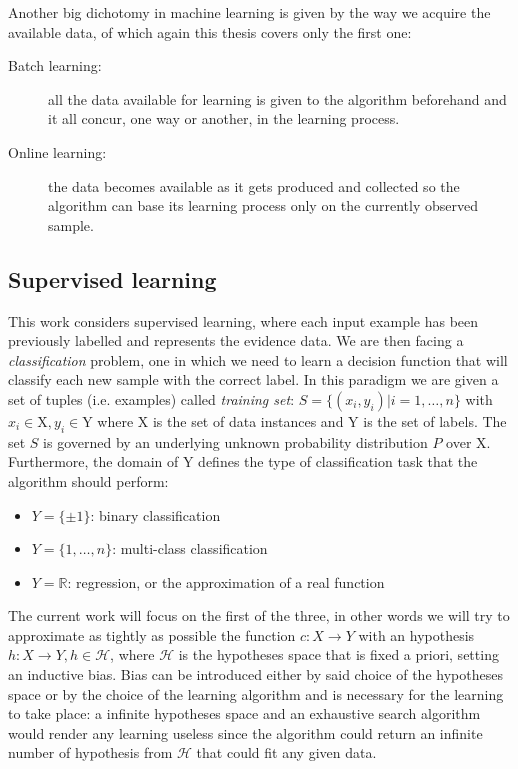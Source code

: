 Another big dichotomy in machine learning is given by the way we acquire the
available data, of which again this thesis covers only the first one:

\begin{description}
    \item [Batch learning:] all the data available for learning is given to the
        algorithm beforehand and it all concur, one way or another, in the
        learning process.
    \item [Online learning:] the data becomes available as it gets produced
        and collected so the algorithm can base its learning process only
        on the currently observed sample.
\end{description}

\subsection{Supervised learning}
\label{subsec:sup}

This work considers supervised learning, where each input example has been
previously labelled and represents the evidence data.
We are then facing a \emph{classification} problem, one in which we need to learn
a decision function that will classify each new sample with the correct label.
In this paradigm we are given a set of tuples (i.e. examples) called \emph{training set}:
$S = \{(x_i, y_i)| i=1,\dots,n\}$ with $x_i \in \mathrm{X}, y_i \in \mathrm{Y}$
where $\mathrm{X}$ is the set of data instances and $\mathrm{Y}$ is the set of
labels.
The set $S$ is governed by an underlying unknown probability distribution $P$ over
$\mathrm{X}$.
Furthermore, the domain of $\mathrm{Y}$ defines the type of classification task
that the algorithm should perform:
\begin{itemize}
    \item $Y = \{\pm{1}\}$: binary classification
    \item $Y = \{1,\dots,n\}$: multi-class classification
    \item $Y = \mathbb{R}$: regression, or the approximation of a real function
\end{itemize}

The current work will focus on the first of the three, in other words we will
try to approximate as tightly as possible the function $c:X\to Y$ with an
hypothesis $h:X\to Y, h\in \mathcal{H}$, where $\mathcal{H}$ is the hypotheses
space that is fixed a priori, setting an inductive bias.
Bias can be introduced either by said choice of the hypotheses space or by the
choice of the learning algorithm and is necessary for the learning to take place:
a infinite hypotheses space and an exhaustive search algorithm would render
any learning useless since the algorithm could return an infinite number of
hypothesis from $\mathcal{H}$ that could fit any given data.

